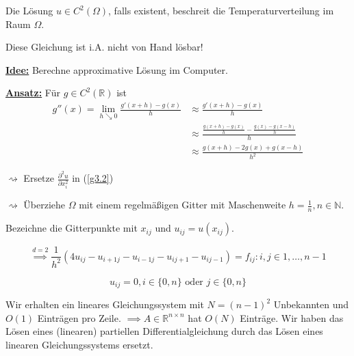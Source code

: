\documentclass{book}
\def\R{\mathbb{R}}
\def\N{\mathbb{N}}
\begin{document}
            Die Lösung $u\in C^2(\Omega)$, falls existent, beschreit die Temperaturverteilung im Raum $\Omega$.

            Diese Gleichung ist i.A. nicht von Hand lösbar! 

            \underline{\textbf{Idee:}} Berechne approximative Lösung im Computer.

            \underline{\textbf{Ansatz:}} Für $g\in C^2(\R)$ ist
            \begin{align*}
                g''(x)=\lim_{h\searrow 0} \frac{g'(x+h)-g(x)}{h} &\approx \frac{g'(x+h)-g(x)}{h} \\
                & \approx \frac{\frac{g(x+h)-g(x)}{h}-\frac{g(x)-g(x-h)}{h}}{h}\\
                &\approx \frac{g(x+h)-2g(x)+g(x-h)}{h^2}
            \end{align*}

            $\rightsquigarrow$ Ersetze $\frac{\partial^2 u}{\partial x_i^2}$ in (\ref{g3.2})

            $\rightsquigarrow$ Überziehe $\Omega$ mit einem regelmäßigen Gitter mit Maschenweite $h=\frac{1}{n},n\in\N$.


            Bezeichne die Gitterpunkte mit $x_{ij}$ und $u_{ij}=u(x_{ij})$.

            \[\stackrel{d=2}{\implies}\frac{1}{h^2}\left(4u_{ij}-u_{i+1j}-u_{i-1j}-u_{ij+1}-u_{ij-1}\right)=f_{ij}:i,j\in1,\dots,n-1\] 

            \[u_{ij}=0,i\in\{0,n\}\text{ oder }j\in\{0,n\}\]

            Wir erhalten ein lineares Gleichungssystem mit $N=(n-1)^2$ Unbekannten und $O(1)$ Einträgen pro Zeile. 
            $\implies A\in\R^{n\times n}$ hat $O(N)$ Einträge. Wir haben das Lösen eines (linearen) partiellen Differentialgleichung durch das Lösen eines linearen 
            Gleichungssystems ersetzt.
\end{document}
